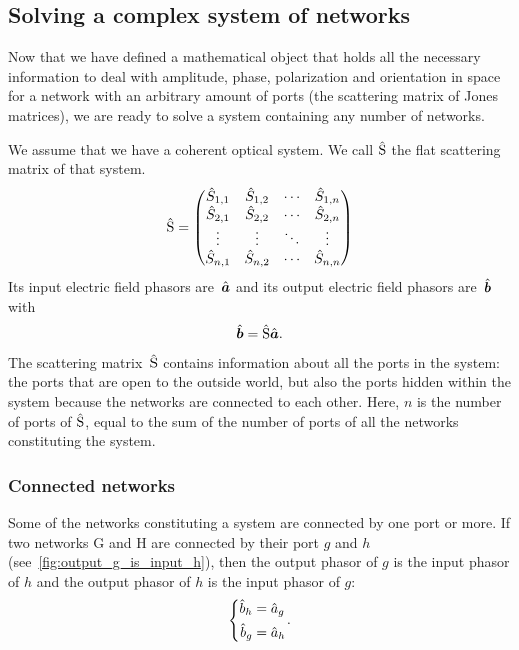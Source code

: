 \subsection{Solving a complex system of networks}
\label{sec:solving_a_system}
Now that we have defined a mathematical object that holds all the necessary information to deal with amplitude, phase, polarization and orientation in space for a network with an arbitrary amount of ports (the scattering matrix of Jones matrices), we are ready to solve a system containing any number of networks.

We assume that we have a coherent optical system.
We call $\hat{\mathrm{S}}$ the flat scattering matrix of that system.
\begin{equation*}
    \hat{\mathrm{S}} =
    \begin{pmatrix}
        \hat{S}_{1, 1} & \hat{S}_{1, 2} & \cdots & \hat{S}_{1, n} \\
        \hat{S}_{2, 1} & \hat{S}_{2, 2} & \cdots & \hat{S}_{2, n} \\
        \vdots   & \vdots   & \ddots & \vdots \\
        \hat{S}_{n, 1} & \hat{S}_{n, 2} & \cdots & \hat{S}_{n, n}
    \end{pmatrix}
\end{equation*}
Its input electric field phasors are~$\hat{\bm{a}}$ and its output electric field phasors are~$\hat{\bm{b}}$ with
\begin{equation*}
    \hat{\bm{b}} = \hat{\mathrm{S}} \hat{\bm{a}}
    \text{.}
\end{equation*}
The scattering matrix~$\hat{\mathrm{S}}$ contains information about all the ports in the system: the ports that are open to the outside world, but also the ports hidden within the system because the networks are connected to each other.
Here, $n$ is the number of ports of $\hat{\mathrm{S}}$, equal to the sum of the number of ports of all the networks constituting the system.




\subsubsection{Connected networks}

Some of the networks constituting a system are connected by one port or more.
If two networks G and H are connected by their port $g$ and $h$ (see~\cref{fig:output_g_is_input_h}), then the output phasor of $g$ is the input phasor of $h$ and the output phasor of $h$ is the input phasor of $g$:
\begin{equation}
    \left\lbrace
    \begin{aligned}
        \cp{b}_h &= \cp{a}_g \\
        \cp{b}_g &= \cp{a}_h
    \end{aligned}
    \right.
    \label{eq:connected_inputs_outputs}
    \text{.}
\end{equation}

